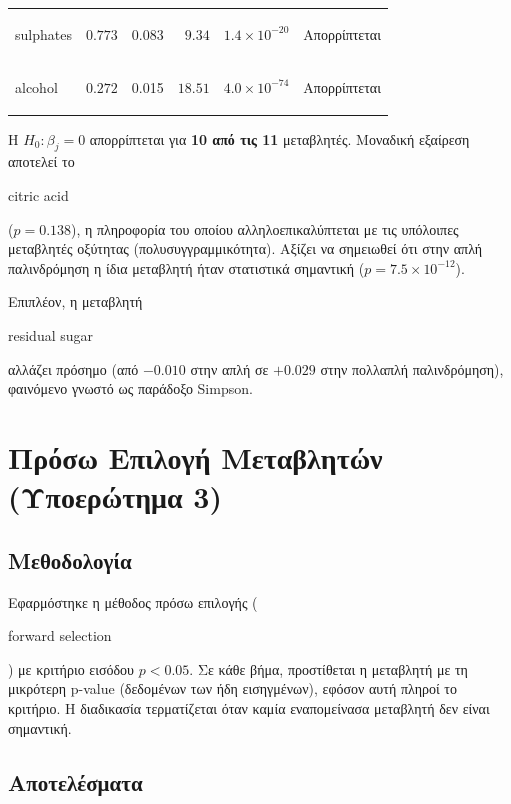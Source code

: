 \documentclass[12pt,a4paper]{article}
\begin{document}
\begin{table}[H]
\begin{tabular}{lrrrrl}
\begin{english}sulphates\end{english}            &   $0.773$    & 0.083  &  $9.34$   & $1.4 \times 10^{-20}$ & Απορρίπτεται \\
\begin{english}alcohol\end{english}              &   $0.272$    & 0.015  & $18.51$   & $4.0 \times 10^{-74}$ & Απορρίπτεται \\
\bottomrule
\end{tabular}
\end{table}

Η $H_0: \beta_j = 0$ απορρίπτεται για \textbf{10 από τις 11} μεταβλητές. Μοναδική εξαίρεση αποτελεί το \begin{english}citric acid\end{english} ($p = 0.138$), η πληροφορία του οποίου αλληλοεπικαλύπτεται με τις υπόλοιπες μεταβλητές οξύτητας (πολυσυγγραμμικότητα). Αξίζει να σημειωθεί ότι στην απλή παλινδρόμηση η ίδια μεταβλητή ήταν στατιστικά σημαντική ($p = 7.5 \times 10^{-12}$).

Επιπλέον, η μεταβλητή \begin{english}residual sugar\end{english} αλλάζει πρόσημο (από $-0.010$ στην απλή σε $+0.029$ στην πολλαπλή παλινδρόμηση), φαινόμενο γνωστό ως παράδοξο Simpson.

\section{Πρόσω Επιλογή Μεταβλητών (Υποερώτημα 3)}

\subsection{Μεθοδολογία}

Εφαρμόστηκε η μέθοδος πρόσω επιλογής (\begin{english}forward selection\end{english}) με κριτήριο εισόδου $p < 0.05$. Σε κάθε βήμα, προστίθεται η μεταβλητή με τη μικρότερη p-value (δεδομένων των ήδη εισηγμένων), εφόσον αυτή πληροί το κριτήριο. Η διαδικασία τερματίζεται όταν καμία εναπομείνασα μεταβλητή δεν είναι σημαντική.

\subsection{Αποτελέσματα}
\end{document}
